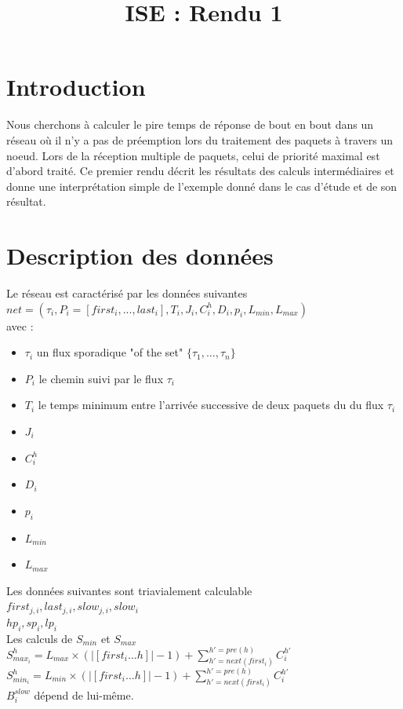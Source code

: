 \documentclass[10pt,a4paper]{article}
\title{ISE : Rendu 1}
\begin{document}
\maketitle

\section{Introduction}
Nous cherchons à calculer le pire temps de réponse de bout en bout dans un réseau où il n'y a pas de préemption lors du traitement des paquets à travers un noeud. Lors de la réception multiple de paquets, celui de priorité maximal est d'abord traité. Ce premier rendu décrit les résultats des calculs intermédiaires et donne une interprétation simple de l'exemple donné dans le cas d'étude et de son résultat.

\section{Description des données}
Le réseau est caractérisé par les données suivantes\\
$net=(\tau_i, P_i = [first_i,...,last_i], T_i, J_i, C_i^h, D_i, p_i, L_{min}, L_{max})$\\
avec : 
\begin{itemize}
\item $\tau_i$ un flux sporadique "of the set" $\{\tau_1, ..., \tau_n\}$
\item $P_i$ le chemin suivi par le flux $\tau_i$
\item $T_i$ le temps minimum entre l'arrivée successive de deux paquets du du flux $\tau_i$
\item $J_i$ 
\item $C_i^h$
\item $D_i$
\item $p_i$
\item $L_{min}$
\item $L_{max}$

\end{itemize}

Les données suivantes sont triavialement calculable\\
$first_{j,i}, last_{j,i}, slow_{j,i}, slow_i$\\
$hp_i, sp_i, lp_i$\\

Les calculs de $S_{min}$ et $S_{max}$\\
$S_{max_i}^h = L_{max} \times (|[first_i ... h]| - 1) + \sum 
\limits_{h'=next(first_i)}^{h'=pre(h)}C_i^{h'}$ \\
$S_{min_i}^h = L_{min} \times (|[first_i ... h]| - 1) + \sum 
\limits_{h'=next(first_i)}^{h'=pre(h)}C_i^{h'}$ \\
$B_{i}^{slow}$ dépend de lui-même.\\
\end{document}
